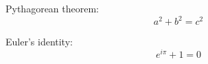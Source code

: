 \documentclass[11pt]{article}
\begin{document}
\noindent
\begin{minipage}[t]{0.46\linewidth}
Pythagorean theorem:
\[
a^2 + b^2 = c^2
\]
\end{minipage}%
\hfill
\begin{minipage}[t]{0.46\linewidth}
Euler's identity:
\[
e^{i\pi} + 1 = 0
\]
\end{minipage}
\end{document}
